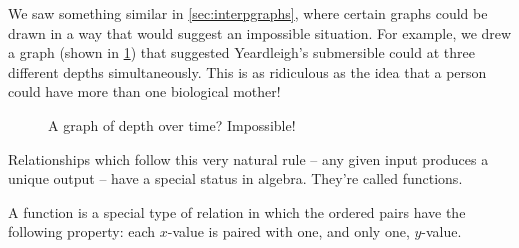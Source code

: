 We saw something similar in \cref{sec:interpgraphs}, where certain graphs could be drawn in a way that would suggest an impossible situation. For example, we drew a graph (shown in \cref{fig:impossible}) that suggested Yeardleigh's submersible could at three different depths simultaneously. This is as ridiculous as the idea that a person could have more than one biological mother! 

\begin{figure}
\centering
{}
	\caption{A graph of depth over time? Impossible!}
	\label{fig:impossible}
\end{figure}

Relationships which follow this very natural rule -- any given input produces a unique output -- have a special status in algebra. They're called \glspl{function}.


\begin{boxdef}[Function]
A \gls{function} is a special type of relation in which the ordered pairs have the following property: each $x$-value is paired with one, and only one, $y$-value.
\end{boxdef}

